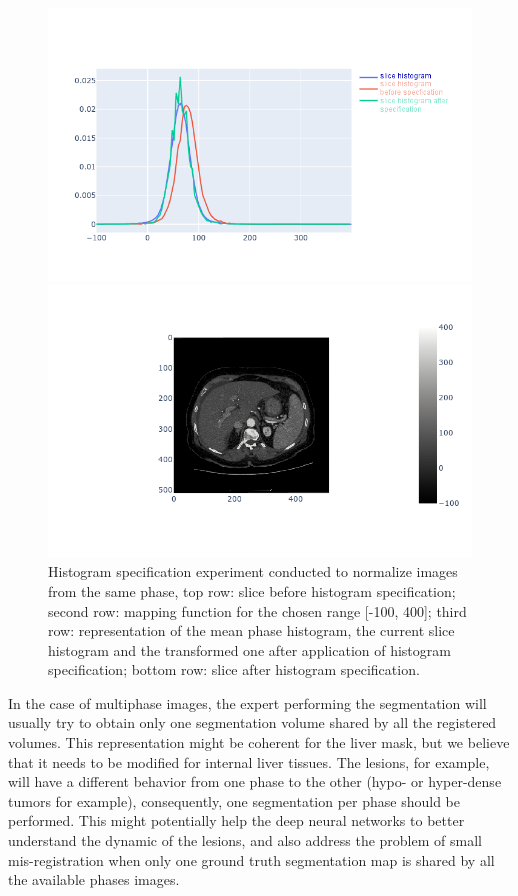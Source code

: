 \begin{figure}[ht!]
\begin{minipage}{0.5\linewidth}
\includegraphics[width=\linewidth]{../Perspectives/images/image2_modified.png}
\end{minipage}
\begin{minipage}{0.5\linewidth}
\includegraphics[width=\linewidth]{../Perspectives/images/image4.png}
\end{minipage}
\caption{Histogram specification experiment conducted to normalize images from the same phase, top row: slice before histogram specification; second row: mapping function for the chosen range [-100, 400]; third row: representation of the mean phase histogram, the current slice histogram and the transformed one after application of histogram specification; bottom row: slice after histogram specification.}
\label{fig:specif}
\end{figure}

In the case of multiphase images, the expert performing the segmentation
will usually try to obtain only one segmentation volume shared by all the 
registered volumes. This representation might be coherent for the liver mask, 
but we believe that it needs to be modified for internal liver tissues. 
The lesions, for example, will have a different behavior from one phase to the other
(hypo- or hyper-dense tumors for example), consequently, one segmentation per phase should
be performed. This might potentially help the deep neural
networks to better understand the dynamic of the lesions, and also
address the problem of small mis-registration when only one ground truth
segmentation map is shared by all the available phases images.

